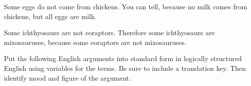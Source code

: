 \begin{exercises}
   \item Some eggs do not come from chickens. You can tell, because no milk comes from chickens, but all eggs are milk.


\item Some ichthyosaurs are not eoraptors. Therefore some ichthyosaurs are mixosauruses, because some eoraptors are not mixosauruses. 
    
\end{exercises}

\noindent\problempart Put the following English arguments into standard form in logically structured English using variables for the terms. Be sure to include a translation key. Then identify mood and figure of the argument.


